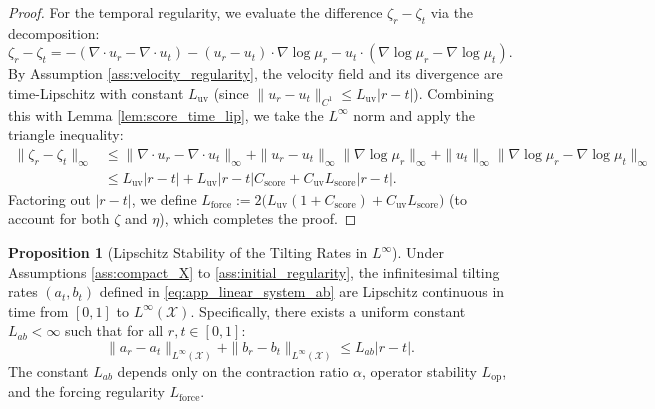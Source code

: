 \documentclass[11pt]{article}
\theoremstyle{definition}
\newtheorem{proposition}[theorem]{Proposition}
\numberwithin{equation}{section}%
\begin{document}
{\begin{proof}
For the temporal regularity, we evaluate the difference $\zeta_r - \zeta_t$ via the decomposition:
\[
\zeta_r - \zeta_t = -(\nabla \cdot u_r - \nabla \cdot u_t) - (u_r - u_t) \cdot \nabla \log \mu_r - u_t \cdot (\nabla \log \mu_r - \nabla \log \mu_t).
\]
By Assumption \ref{ass:velocity_regularity}, the velocity field and its divergence are time-Lipschitz with constant $L_{\mathrm{uv}}$ (since $\|u_r-u_t\|_{C^1} \le L_{\mathrm{uv}}|r-t|$). Combining this with Lemma \ref{lem:score_time_lip}, we take the $L^\infty$ norm and apply the triangle inequality:
\begin{align*}
\|\zeta_r - \zeta_t\|_\infty &\le \|\nabla \cdot u_r - \nabla \cdot u_t\|_\infty + \|u_r - u_t\|_\infty \|\nabla \log \mu_r\|_\infty + \|u_t\|_\infty \|\nabla \log \mu_r - \nabla \log \mu_t\|_\infty \\
&\le L_{\mathrm{uv}}|r-t| + L_{\mathrm{uv}}|r-t| C_{\mathrm{score}} + C_{\mathrm{uv}} L_{\mathrm{score}} |r-t|.
\end{align*}
Factoring out $|r-t|$, we define $L_{\mathrm{force}} := 2 \big( L_{\mathrm{uv}}(1 + C_{\mathrm{score}}) + C_{\mathrm{uv}} L_{\mathrm{score}} \big)$ (to account for both $\zeta$ and $\eta$), which completes the proof.
\end{proof}

\begin{proposition}[Lipschitz Stability of the Tilting Rates in $L^\infty$]
\label{prop:ab_stability}
Under Assumptions \ref{ass:compact_X} to \ref{ass:initial_regularity}, the infinitesimal tilting rates $(a_t, b_t)$ defined in \eqref{eq:app_linear_system_ab} are Lipschitz continuous in time from $[0,1]$ to $L^\infty(\mathcal{X})$. Specifically, there exists a uniform constant $L_{ab} < \infty$ such that for all $r, t \in [0,1]$:
\begin{equation*}
\|a_r - a_t\|_{L^\infty(\mathcal{X})} + \|b_r - b_t\|_{L^\infty(\mathcal{X})} \le L_{ab} |r - t|.
\end{equation*}
The constant $L_{ab}$ depends only on the contraction ratio $\alpha$, operator stability $L_{\mathrm{op}}$, and the forcing regularity $L_{\mathrm{force}}$.
\end{proposition}

}
\end{document}
